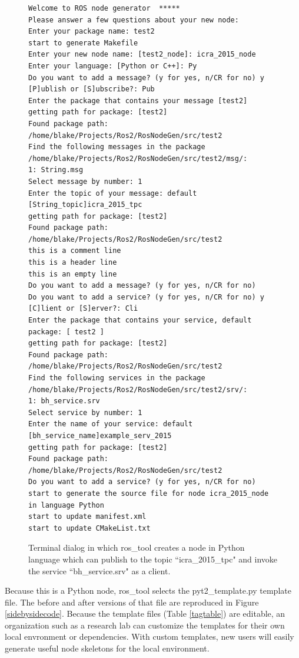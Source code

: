 \documentclass[letterpaper, 10 pt, conference]{ieeeconf}  %
\begin{document}
\begin{figure}
{\small
\begin{verbatim}
Welcome to ROS node generator  *****
Please answer a few questions about your new node:
Enter your package name: test2
start to generate Makefile
Enter your new node name: [test2_node]: icra_2015_node
Enter your language: [Python or C++]: Py
Do you want to add a message? (y for yes, n/CR for no) y
[P]ublish or [S]ubscribe?: Pub
Enter the package that contains your message [test2]
getting path for package: [test2]
Found package path: /home/blake/Projects/Ros2/RosNodeGen/src/test2
Find the following messages in the package /home/blake/Projects/Ros2/RosNodeGen/src/test2/msg/:
1: String.msg
Select message by number: 1
Enter the topic of your message: default [String_topic]icra_2015_tpc
getting path for package: [test2]
Found package path: /home/blake/Projects/Ros2/RosNodeGen/src/test2
this is a comment line
this is a header line
this is an empty line
Do you want to add a message? (y for yes, n/CR for no)
Do you want to add a service? (y for yes, n/CR for no) y
[C]lient or [S]erver?: Cli
Enter the package that contains your service, default package: [ test2 ]
getting path for package: [test2]
Found package path: /home/blake/Projects/Ros2/RosNodeGen/src/test2
Find the following services in the package /home/blake/Projects/Ros2/RosNodeGen/src/test2/srv/:
1: bh_service.srv
Select service by number: 1
Enter the name of your service: default [bh_service_name]example_serv_2015
getting path for package: [test2]
Found package path: /home/blake/Projects/Ros2/RosNodeGen/src/test2
Do you want to add a service? (y for yes, n/CR for no)
start to generate the source file for node icra_2015_node in language Python
start to update manifest.xml
start to update CMakeList.txt
\end{verbatim}
}
\caption{Terminal dialog in which ros\_tool creates a node in Python language which can publish to the topic ``icra\_2015\_tpc" and invoke the service ``bh\_service.srv" as a client.}\label{dialogexample}
\end{figure}

Because this is a Python node, ros\_tool selects  the pyt2\_template.py template file.  The before and after versions of that file are reproduced in Figure \ref{sidebysidecode}.  Because the template files (Table \ref{tagtable}) are editable, an organization such as a research lab can customize the templates for their own local envronment or dependencies.   With custom templates, new users will easily generate useful node skeletons for the local environment.
\end{document}
